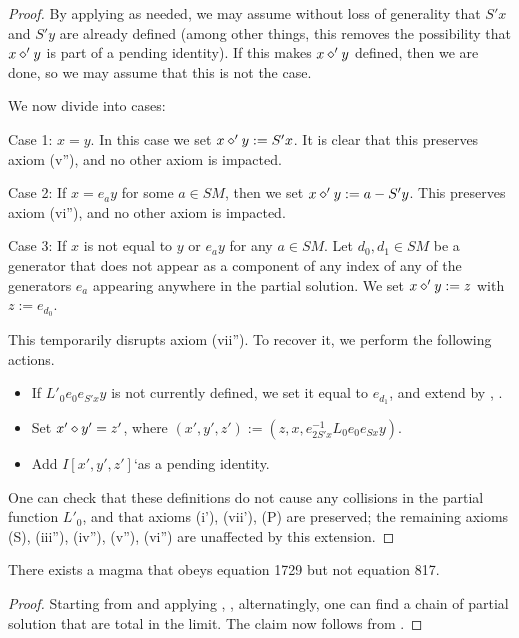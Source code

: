 \begin{proof}  By applying  as needed, we may assume without loss of generality that $S'x$ and $S'y$ are already defined (among other things, this removes the possibility that $x \diamond' y$ is part of a pending identity).  If this makes $x \diamond' y$ defined, then we are done, so we may assume that this is not the case.

We now divide into cases:

Case 1: $x=y$.  In this case we set $x \diamond' y := S'x$.  It is clear that this preserves axiom (v''), and no other axiom is impacted.

Case 2: If $x = e_a y$ for some $a \in SM$, then we set $x \diamond' y := a - S'y$.  This preserves axiom (vi''), and no other axiom is impacted.

Case 3: If $x$ is not equal to $y$ or $e_a y$ for any $a \in SM$.  Let $d_0, d_1 \in SM$ be a generator that does not appear as a component of any index of any of the generators $e_a$ appearing anywhere in the partial solution.  We set $x \diamond' y := z$ with $z := e_{d_0}$.

This temporarily disrupts axiom (vii'').  To recover it, we perform the following actions.
\begin{itemize}
  \item If $L'_0 e_0 e_{S'x} y$ is not currently defined, we set it equal to $e_{d_1}$, and extend by , .
  \item Set $x' \diamond y' = z'$, where $(x',y',z') := (z, x, e_{2S'x}^{-1} L_0 e_0 e_{Sx} y)$.
  \item Add $I[x',y',z']$`as a pending identity.
\end{itemize}

One can check that these definitions do not cause any collisions in the partial function $L'_0$, and that axioms (i'), (vii'), (P) are preserved; the remaining axioms (S), (iii''), (iv''), (v''), (vi'') are unaffected by this extension.
\end{proof}


\begin{theorem}\label{1729_refute_817}\leanok There exists a magma that obeys equation 1729 but not equation 817.
\end{theorem}

\begin{proof}
  Starting from  and applying , ,  alternatingly, one can find a chain of partial solution that are total in the limit.  The claim now follows from .
\end{proof}
